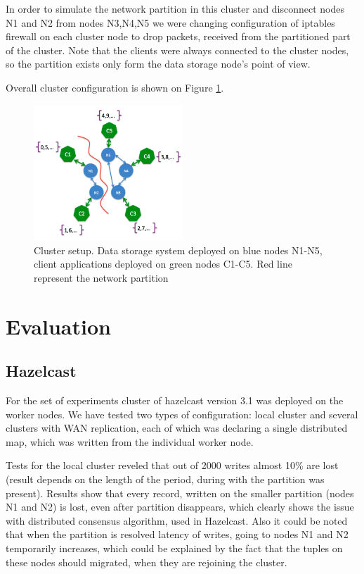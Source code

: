 \documentclass[a4paper]{article}
\begin{document}
In order to simulate the network partition in this cluster and disconnect nodes N1 and N2 from nodes N3,N4,N5 we were changing configuration of iptables firewall on each cluster node to drop packets, received from the partitioned part of the cluster.
Note that the clients were always connected to the cluster nodes, so the partition exists only form the data storage node's point of view.

Overall cluster configuration is shown on Figure \ref{fig:cluster}.

\begin{figure}[h!]
	\centering
	\includegraphics[width=0.5\textwidth]{cluster}
	\caption{Cluster setup. Data storage system deployed on blue nodes N1-N5, client applications deployed on green nodes C1-C5. Red line represent the network partition}
	\label{fig:cluster}
\end{figure}

\section{Evaluation}

\subsection{Hazelcast}

For the set of experiments cluster of hazelcast version 3.1 was deployed on the worker nodes. 
We have tested two types of configuration: local cluster and several clusters with WAN replication, each of which was declaring a single distributed map, which was written from the individual worker node.

Tests for the local cluster reveled that out of 2000 writes almost 10\% are lost (result depends on the length of the period, during with the partition was present).
Results show that every record, written on the smaller partition (nodes N1 and N2) is lost, even after partition disappears, which clearly shows the issue with distributed consensus algorithm, used in Hazelcast.
Also it could be noted that when the partition is resolved latency of writes, going to nodes N1 and N2 temporarily increases, which could be explained by the fact that the tuples on these nodes should migrated, when they are rejoining the cluster.
\end{document}
